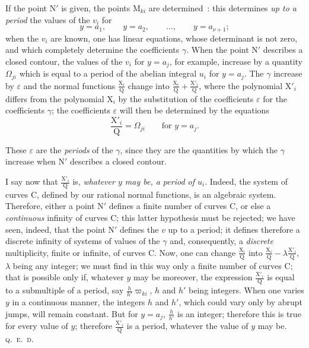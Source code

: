 \documentclass{article}
\begin{document}
If the point $\mathrm{N}'$ is given, the points $\mathrm{M}_{ki}$ are determined~: this determines \emph{up to a period} the values of the $v_{i}$ for
\[
y = a_{1}, \qquad y = a_{2}, \qquad \dots, \qquad y = a_{\nu+1};
\]
when the $v_{i}$ are known, one has linear equations, whose determinant is not zero, and which completely determine the coefficients $\gamma$. When the point $\mathrm{N}'$ describes a closed contour, the values of the $v_{i}$ for $y = a_{j}$, for example, increase by a quantity $\Omega_{ji}$ which is equal to a period of the abelian integral $u_{i}$ for $y = a_{j}$. The $\gamma$ increase by $\varepsilon$ and the normal functions $\frac{\mathrm{X}_{i}}{\mathrm{Q}}$ change into $\frac{\mathrm{X}_{i}}{\mathrm{Q}} + \frac{\mathrm{X}'_{i}}{\mathrm{Q}}$, where the polynomial $\mathrm{X}'_{i}$ differs from the polynomial $\mathrm{X}_{i}$ by the substitution of the coefficients $\varepsilon$ for the coefficients $\gamma$; the coefficients $\varepsilon$ will then be determined by the equations
\[
\frac{\mathrm{X}'_{i}}{\mathrm{Q}} = \Omega_{ji} \qquad \text{for } y = a_{j}.
\]

These $\varepsilon$ are the \emph{periods} of the $\gamma$, since they are the quantities by which the $\gamma$ increase when $\mathrm{N}'$ describes a closed contour.

I say now that $\frac{\mathrm{X}'_{i}}{\mathrm{Q}}$ is, \emph{whatever $y$ may be, a period of $u_{i}$}. Indeed, the system of curves $\mathrm{C}$, defined by our rational normal functions, is an algebraic system. Therefore, either a point $\mathrm{N}'$ defines a finite number of
curves $\mathrm{C}$, or else a \emph{continuous} infinity of curves $\mathrm{C}$; this latter hypothesis must be rejected; we have seen, indeed, that the point $\mathrm{N}'$ defines the $v$ up to a period; it defines therefore a discrete infinity of systems of values of the $\gamma$ and, consequently, a \emph{discrete} multiplicity, finite or infinite, of curves $\mathrm{C}$. Now, one can change $\frac{\mathrm{X}_{i}}{\mathrm{Q}}$ into $\frac{\mathrm{X}_{i}}{\mathrm{Q}} - \lambda \frac{\mathrm{X}'_{i}}{\mathrm{Q}}$, $\lambda$ being any integer; we must find in this way only a finite number of curves $\mathrm{C}$; that is possible only if, whatever $y$ may be moreover, the expression $\frac{\mathrm{X}'_{i}}{\mathrm{Q}}$ is equal to a submultiple of a period, say $\frac{h}{h'}\varpi_{ki}$, $h$ and $h'$ being integers. When one varies $y$ in a continuous manner, the integers $h$ and $h'$, which could vary only by abrupt jumps, will remain constant. But for $y = a_{j}$, $\frac{h}{h'}$ is an integer; therefore this is true for every value of $y$; therefore $\frac{\mathrm{X}'_{i}}{\mathrm{Q}}$ is a period, whatever the value of $y$ may be. \hfill \textsc{q.~e.~d.}
\end{document}
